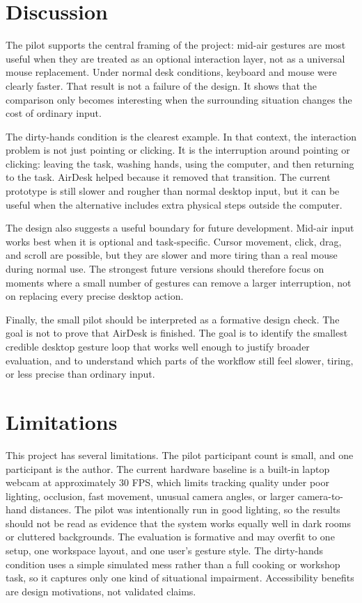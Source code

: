 \documentclass[manuscript]{acmart}
\begin{document}
\section{Discussion}

The pilot supports the central framing of the project: mid-air gestures are most useful when they are treated as an optional interaction layer, not as a universal mouse replacement. Under normal desk conditions, keyboard and mouse were clearly faster. That result is not a failure of the design. It shows that the comparison only becomes interesting when the surrounding situation changes the cost of ordinary input.

The dirty-hands condition is the clearest example. In that context, the interaction problem is not just pointing or clicking. It is the interruption around pointing or clicking: leaving the task, washing hands, using the computer, and then returning to the task. AirDesk helped because it removed that transition. The current prototype is still slower and rougher than normal desktop input, but it can be useful when the alternative includes extra physical steps outside the computer.

The design also suggests a useful boundary for future development. Mid-air input works best when it is optional and task-specific. Cursor movement, click, drag, and scroll are possible, but they are slower and more tiring than a real mouse during normal use. The strongest future versions should therefore focus on moments where a small number of gestures can remove a larger interruption, not on replacing every precise desktop action.

Finally, the small pilot should be interpreted as a formative design check. The goal is not to prove that AirDesk is finished. The goal is to identify the smallest credible desktop gesture loop that works well enough to justify broader evaluation, and to understand which parts of the workflow still feel slower, tiring, or less precise than ordinary input.

\section{Limitations}

This project has several limitations. The pilot participant count is small, and one participant is the author. The current hardware baseline is a built-in laptop webcam at approximately 30 FPS, which limits tracking quality under poor lighting, occlusion, fast movement, unusual camera angles, or larger camera-to-hand distances. The pilot was intentionally run in good lighting, so the results should not be read as evidence that the system works equally well in dark rooms or cluttered backgrounds. The evaluation is formative and may overfit to one setup, one workspace layout, and one user's gesture style. The dirty-hands condition uses a simple simulated mess rather than a full cooking or workshop task, so it captures only one kind of situational impairment. Accessibility benefits are design motivations, not validated claims.
\end{document}

